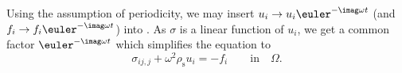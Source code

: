 Using the assumption of periodicity, we may insert $u_i \rightarrow u_i \euler^{-\imag\omega t}$  (and $f_i \rightarrow f_i \euler^{-\imag\omega t}$) into . As $\sigma$ is a linear function of $u_i$, we get a common factor $\euler^{-\imag\omega t}$ which simplifies the equation to
\begin{equation}
	\sigma_{ij,j} + \omega^2 \rho_{\mathrm{s}} u_i = -f_i \qquad \text{in}\quad \Omega\label{Eq2:mainDiffEqn2}.
\end{equation}
